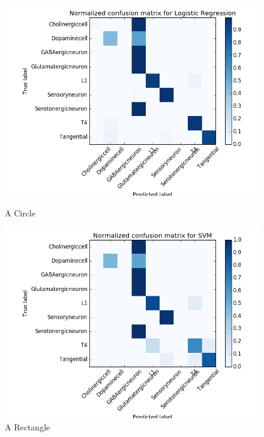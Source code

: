 \documentclass[10pt,twocolumn]{article}
\begin{document}
\begin{figure}[htbp] 
	\begin{minipage}{0.5\linewidth} 
		\centering 
		\includegraphics[width=\textwidth]{img/LGmatrix.png} 
		\caption{A Circle} 
		\label{fig:circle} 
	\end{minipage}%
	\begin{minipage}{0.5\linewidth} 
		\centering 
		\includegraphics[width=\textwidth]{img/SVMmatrix.png}
		\caption{A Rectangle} 
		\label{fig:rectangle} 
	\end{minipage}
\end{figure}	
\end{document}
